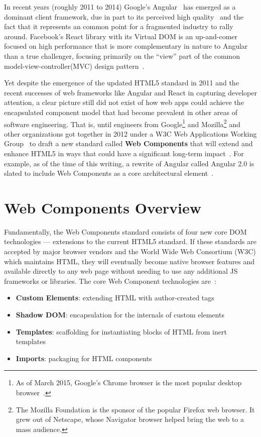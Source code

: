 In recent years (roughly 2011 to 2014) Google's Angular~\cite{googledevelopers2015-b}
has emerged as a dominant client framework, 
due in part to its perceived high quality~\cite{dickey2014} and the fact that it represents an common point for a fragmented industry to rally around.
Facebook's React library with its Virtual DOM is an up-and-comer focused on high performance that is more complementary in nature to Angular than a true challenger, 
focusing primarily on the ``view'' part of the common 
model-view-controller(MVC) 
design pattern~\cite{reactcontributors2015}.

Yet despite the emergence of the updated HTML5 standard in 2011 and the recent successes of web frameworks like Angular and React in capturing developer attention, 
a clear picture still did not exist of how web apps could achieve the encapsulated component model that had become prevalent in other areas of software engineering.
That is, until engineers from Google\footnote{
As of March 2015, Google's Chrome browser is the most popular desktop browser~\cite{zachte2015}.}
and Mozilla\footnote{
The Mozilla Foundation is the sponsor of the popular Firefox web browser. It grew out of Netscape, whose Navigator browser helped bring the web to a mass audience.}
and other organizations got together in 2012 under a W3C Web Applications Working Group~\cite{w3c2015} 
to draft a new standard called \textbf{Web Components} that will extend and enhance HTML5 in ways that could have a significant long-term impact~\cite{yveslafon2015}. 
For example, as of the time of this writing, a rewrite of Angular called Angular 2.0 is slated to include Web Components as a core architectural element~\cite{santiagoesteva2015}.

\section{Web Components Overview}
Fundamentally, the Web Components standard consists of four new core DOM technologies --- extensions to the current HTML5 standard.
If these standards are accepted by major browser vendors and the World Wide Web Consortium (W3C)
which maintains HTML, 
they will eventually become native browser features and available directly to any web page without needing to use any additional JS frameworks or libraries. 
The core Web Component technologies are~\cite{penades2015}:
\begin{itemize}
\item
\textbf{Custom Elements}: extending HTML with author-created tags
\item
\textbf{Shadow DOM}: encapsulation for the internals of custom elements
\item
\textbf{Templates}: scaffolding for instantiating blocks of HTML from inert templates
\item
\textbf{Imports}: packaging for HTML components
\end{itemize}

